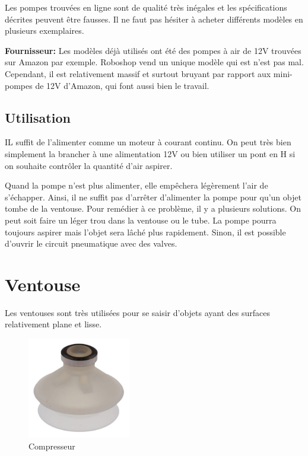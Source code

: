 \documentclass[a4paper, 11pt]{report}
\begin{document}
Les pompes trouvées en ligne sont de qualité très inégales et les spécifications décrites peuvent être fausses. Il ne faut pas hésiter à acheter différents modèles en plusieurs exemplaires. 

\textbf{Fournisseur:}
Les modèles déjà utilisés ont été des pompes à air de 12V trouvées sur Amazon par exemple. Roboshop vend un unique modèle qui est n'est pas mal. Cependant, il est relativement massif et surtout bruyant par rapport aux mini-pompes de 12V d'Amazon, qui font aussi bien le travail.

\subsection{Utilisation}
IL suffit de l'alimenter comme un moteur à courant continu. On peut très bien simplement la brancher à une alimentation 12V ou bien utiliser un pont en H si on souhaite contrôler la quantité d'air aspirer. 

Quand la pompe n'est plus alimenter, elle empêchera légèrement l'air de s'échapper. Ainsi, il ne suffit pas d'arrêter d'alimenter la pompe pour qu'un objet tombe de la ventouse. Pour remédier à ce problème, il y a plusieurs solutions. On peut soit faire un léger trou dans la ventouse ou le tube. La pompe pourra toujours aspirer mais l'objet sera lâché plus rapidement. Sinon, il est possible d'ouvrir le circuit pneumatique avec des valves.

\section{Ventouse}
Les ventouses sont très utilisées pour se saisir d'objets ayant des surfaces relativement plane et lisse.

\begin{figure}
\begin{centering}
\includegraphics[width=0.4\textwidth]{images/ventouseSoufflet.jpg}
\caption{Compresseur}
\par\end{centering}
\end{figure}
\end{document}
